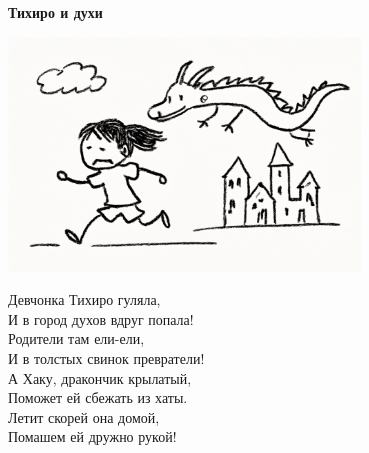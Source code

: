 \vspace*{\fill}
\begin{center}
  {\huge\textbf{Тихиро и духи}}

  \vspace{1.5em}  \includegraphics[width=0.7\textwidth]{pictures/chihiro.png}
  \vspace{4em}
  \parbox{0.6\textwidth}{
    \LARGE
    \begin{spacing}{1.2}
      Девчонка Тихиро гуляла,\\
      И в город духов вдруг попала!\\
      Родители там ели-ели,\\
      И в толстых свинок превратели!\\
      \vspace{1em}
      А Хаку, дракончик крылатый,\\
      Поможет ей сбежать из хаты.\\
      Летит скорей она домой,\\
      Помашем ей дружно рукой! %
    \end{spacing}
      
  }
\end{center}
\vspace*{\fill}